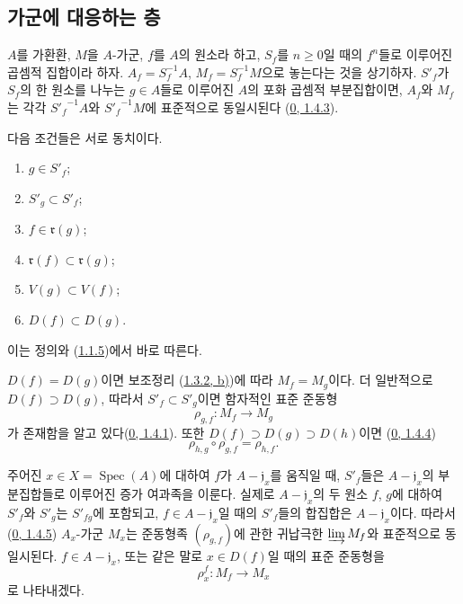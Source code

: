 \subsection{가군에 대응하는 층}
\label{subsection:I.1.3-ko}
\label{I.1.3-ko}

\begin{env}[1.3.1]
\label{I.1.3.1-ko}
$A$를 가환환, $M$을 $A$-가군, $f$를 $A$의 원소라 하고,
$S_f$를 $n\geq0$일 때의 $f^n$들로 이루어진 곱셈적 집합이라 하자.
$A_f=S_f^{-1}A$, $M_f=S_f^{-1}M$으로 놓는다는 것을 상기하자.
$S'_f$가 $S_f$의 한 원소를 나누는 $g\in A$들로 이루어진 $A$의
포화 곱셈적 부분집합이면, $A_f$와 $M_f$는 각각
${S'_f}^{-1}A$와 ${S'_f}^{-1}M$에 표준적으로 동일시된다
(\hyperref[0.1.4.3-ko]{0, 1.4.3}).
\end{env}

\begin{lemma}[1.3.2]
\label{I.1.3.2-ko}
다음 조건들은 서로 동치이다.
\begin{enumerate}
  \item[\rm(a)] $g\in S'_f$;
  \item[\rm(b)] $S'_g\subset S'_f$;
  \item[\rm(c)] $f\in\mathfrak{r}(g)$;
  \item[\rm(d)] $\mathfrak{r}(f)\subset\mathfrak{r}(g)$;
  \item[\rm(e)] $V(g)\subset V(f)$;
  \item[\rm(f)] $D(f)\subset D(g)$.
\end{enumerate}
\end{lemma}

이는 정의와 (\hyperref[I.1.1.5-ko]{1.1.5})에서 바로 따른다.

\begin{env}[1.3.3]
\label{I.1.3.3-ko}
$D(f)=D(g)$이면 보조정리 (\hyperref[I.1.3.2-ko]{1.3.2, b)})에
따라 $M_f=M_g$이다. 더 일반적으로 $D(f)\supset D(g)$, 따라서
$S'_f\subset S'_g$이면 함자적인 표준 준동형
\[
  \rho_{g,f}:M_f\longrightarrow M_g
\]
가 존재함을 알고 있다(\hyperref[0.1.4.1-ko]{0, 1.4.1}). 또한
$D(f)\supset D(g)\supset D(h)$이면
(\hyperref[0.1.4.4-ko]{0, 1.4.4})
\begin{equation}
  \rho_{h,g}\circ\rho_{g,f}=\rho_{h,f}.
  \tag{1.3.3.1}\label{I.1.3.3.1-ko}
\end{equation}
\end{env}

주어진 $x\in X=\operatorname{Spec}(A)$에 대하여 $f$가
$A-\mathfrak{j}_x$를 움직일 때, $S'_f$들은
$A-\mathfrak{j}_x$의 부분집합들로 이루어진 증가 여과족을 이룬다.
실제로 $A-\mathfrak{j}_x$의 두 원소 $f$, $g$에 대하여 $S'_f$와
$S'_g$는 $S'_{fg}$에 포함되고, $f\in A-\mathfrak{j}_x$일 때의
$S'_f$들의 합집합은 $A-\mathfrak{j}_x$이다. 따라서
(\hyperref[0.1.4.5-ko]{0, 1.4.5}) $A_x$-가군 $M_x$는 준동형족
$(\rho_{g,f})$에 관한 귀납극한 $\varinjlim M_f$와 표준적으로
동일시된다. $f\in A-\mathfrak{j}_x$, 또는 같은 말로
$x\in D(f)$일 때의 표준 준동형을
\[
  \rho_x^f:M_f\longrightarrow M_x
\]
로 나타내겠다.

